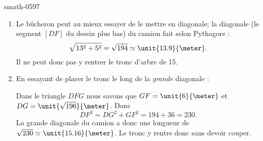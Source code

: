 
\begin{corrige}{smath-0597}

    \begin{enumerate}
        \item
            Le bûcheron peut au mieux essayer de le mettre en diagonale; la diagonale (le segment \( [DF]\) du dessin plus bas) du camion fait selon Pythagore :
            \begin{equation}
                \sqrt{13^2+5^2}=\sqrt{194}\simeq \unit{13.9}{\meter}.
            \end{equation}
            Il ne peut donc pas y rentrer le tronc d'arbre de \unit{15}{\meter}.
        \item
            En essayant de placer le tronc le long de la \emph{grande} diagonale :
            \begin{center}
   
            \end{center}
            Dans le triangle \( DFG\) nous savons que \( GF=\unit{6}{\meter}\) et \( DG=\unit{\sqrt{196}}{\meter}\). Donc
            \begin{equation}
                DF^2=DG^2+GF^2=194+36=230.
            \end{equation}
            La grande diagonale du camion a donc une longueur de \( \sqrt{230}\simeq\unit{15.16}{\meter}\). Le tronc y rentre donc sans devoir couper.
    \end{enumerate}

\end{corrige}
